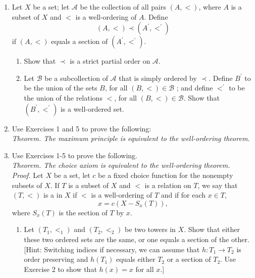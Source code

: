 \begin{enumerate}[itemsep=0.4em, parsep=0pt, topsep=0pt, partopsep=0pt, leftmargin=*, label=\arabic*., ref=\arabic*]
\begin{enumerate}[itemsep=0.2em, parsep=0pt, topsep=0pt, partopsep=0pt, leftmargin=*, label=(\alph*), align=left]
  \item Suppose that \(A\) and \(B\) are well-ordered sets that are uncountable, such that every section of \(A\) and of \(B\) is countable. Show \(A\) and \(B\) have the same order type.
  \end{enumerate}
\item Let \(X\) be a set; let \(\mathcal{A}\) be the collection of all pairs \(({A, < })\), where \(A\) is a subset of \(X\) and \(<\) is a well-ordering of \(A\). Define \[ ({A, < }) \prec ({A^{\prime },{ < }^{\prime }}) \] if \(({A, < })\) equals a section of \(({A^{\prime },{ < }^{\prime }})\).
  \begin{enumerate}[itemsep=0.2em, parsep=0pt, topsep=0pt, partopsep=0pt, leftmargin=*, label=(\alph*), align=left]
  \item Show that \(\prec\) is a strict partial order on \(\mathcal{A}\).
  \item Let \(\mathcal{B}\) be a subcollection of \(\mathcal{A}\) that is simply ordered by \(\prec\). Define \(B^{\prime }\) to be the union of the sets \(B\), for all \(({B, < }) \in \mathcal{B}\) ; and define \({ < }^{\prime }\) to be the union of the relations \(<\), for all \(({B, < }) \in \mathcal{B}\). Show that \(({B^{\prime },{ < }^{\prime }})\) is a well-ordered set.
  \end{enumerate}
\item Use Exercises 1 and 5 to prove the following: \\ \textsl{Theorem. The maximum principle is equivalent to the well-ordering theorem.}
\item Use Exercises 1-5 to prove the following. \\ \textsl{Theorem. The choice axiom is equivalent to the well-ordering theorem.} \\ \textsl{Proof.} Let \(X\) be a set, let \(c\) be a fixed choice function for the nonempty subsets of \(X\). If \(T\) is a subset of \(X\) and \(<\) is a relation on \(T\), we say that \(({T, < })\) is a  in \(X\) if \(<\) is a well-ordering of \(T\) and if for each \(x \in T\), \[ x = c({X - S_{x}(T) }), \] where \(S_{x}(T)\) is the section of \(T\) by \(x\).
  \begin{enumerate}[itemsep=0.2em, parsep=0pt, topsep=0pt, partopsep=0pt, leftmargin=*, label=(\alph*), align=left]
  \item Let \(({T_{1},{ < }_{1}})\) and \(({T_{2},{ < }_{2}})\) be two towers in \(X\). Show that either these two ordered sets are the same, or one equals a section of the other. [Hint: Switching indices if necessary, we can assume that \(h : T_{1} \rightarrow {T}_{2}\) is order preserving and \(h(T_{1})\) equals either \(T_{2}\) or a section of \(T_{2}\). Use Exercise 2 to show that \(h(x) = x\) for all \(x\).]

\end{enumerate}
\end{enumerate}

